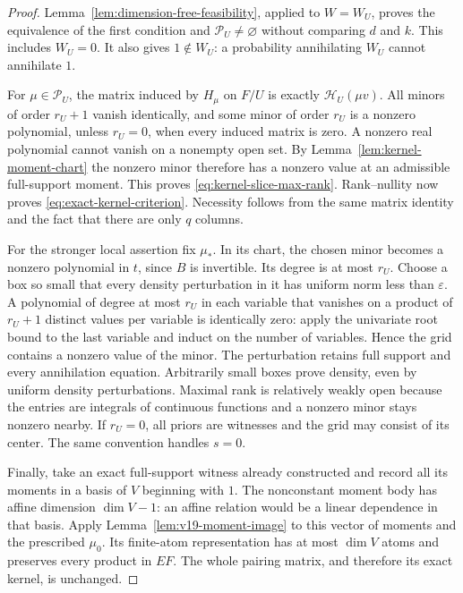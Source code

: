 \begin{proof}
Lemma~\ref{lem:dimension-free-feasibility}, applied to $W=W_U$,
proves the equivalence of the first condition and
$\mathcal P_U\ne\varnothing$ without comparing $d$ and $k$.
This includes $W_U=0$. It also gives $1\notin W_U$:
a probability annihilating $W_U$ cannot annihilate $1$.

For $\mu\in\mathcal P_U$, the matrix induced by $H_\mu$ on $F/U$
is exactly $\mathscr H_U(\mu v)$. All minors of order $r_U+1$
vanish identically, and some minor of order $r_U$ is a nonzero
polynomial, unless $r_U=0$, when every induced matrix is zero.
A nonzero real polynomial cannot vanish on a nonempty open set. By
Lemma~\ref{lem:kernel-moment-chart} the nonzero minor therefore has a
nonzero value at an admissible full-support moment. This proves
\eqref{eq:kernel-slice-max-rank}. Rank--nullity now proves
\eqref{eq:exact-kernel-criterion}. Necessity follows from the same
matrix identity and the fact that there are only $q$ columns.

For the stronger local assertion fix $\mu_*$. In its chart, the chosen
minor becomes a nonzero polynomial in $t$, since $B$ is invertible.
Its degree is at most $r_U$. Choose a box so small that every density
perturbation in it has uniform norm less than $\varepsilon$. A
polynomial of degree at most $r_U$ in each variable that vanishes on a
product of $r_U+1$ distinct values per variable is identically zero:
apply the univariate root bound to the last variable and induct on the
number of variables. Hence the grid contains a nonzero value of the
minor. The perturbation retains full support and every annihilation
equation. Arbitrarily small boxes prove density, even by uniform density
perturbations. Maximal rank is relatively weakly open because the
entries are integrals of continuous functions and a nonzero minor stays
nonzero nearby. If $r_U=0$, all priors are witnesses and the grid may
consist of its center. The same convention handles $s=0$.

Finally, take an exact full-support witness already constructed and
record all its moments in a basis of $V$ beginning with $1$. The
nonconstant moment body has affine dimension $\dim V-1$: an affine
relation would be a linear dependence in that basis. Apply
Lemma~\ref{lem:v19-moment-image} to this vector of moments and the
prescribed $\mu_0$. Its finite-atom representation has at most $\dim V$
atoms and preserves every product in $EF$. The whole pairing matrix,
and therefore its exact kernel, is unchanged.
\end{proof}

